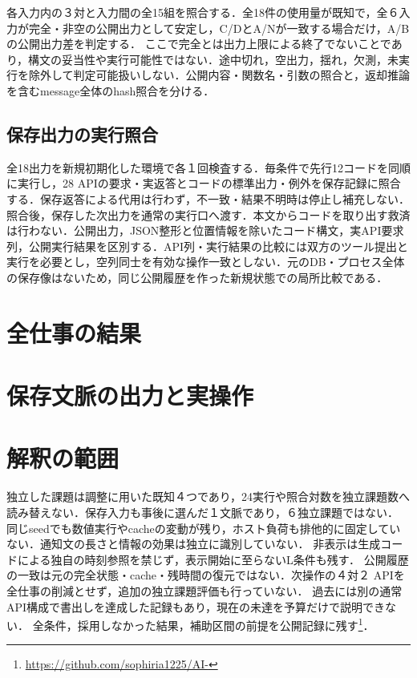 \documentclass[letter]{ieicej}
\begin{document}
各入力内の３対と入力間の全15組を照合する．全18件の使用量が既知で，全６入力が完全・非空の公開出力として安定し，C/DとA/Nが一致する場合だけ，A/Bの公開出力差を判定する．
ここで完全とは出力上限による終了でないことであり，構文の妥当性や実行可能性ではない．途中切れ，空出力，揺れ，欠測，未実行を除外して判定可能扱いしない．公開内容・関数名・引数の照合と，返却推論を含むmessage全体のhash照合を分ける．

\subsection{保存出力の実行照合}
全18出力を新規初期化した環境で各１回検査する．毎条件で先行12コードを同順に実行し，28 APIの要求・実返答とコードの標準出力・例外を保存記録に照合する．保存返答による代用は行わず，不一致・結果不明時は停止し補充しない．照合後，保存した次出力を通常の実行口へ渡す．本文からコードを取り出す救済は行わない．公開出力，JSON整形と位置情報を除いたコード構文，実API要求列，公開実行結果を区別する．API列・実行結果の比較には双方のツール提出と実行を必要とし，空列同士を有効な操作一致としない．元のDB・プロセス全体の保存像はないため，同じ公開履歴を作った新規状態での局所比較である．

\section{全仕事の結果}





\section{保存文脈の出力と実操作}


\section{解釈の範囲}
独立した課題は調整に用いた既知４つであり，24実行や照合対数を独立課題数へ読み替えない．保存入力も事後に選んだ１文脈であり，６独立課題ではない．
同じseedでも数値実行やcacheの変動が残り，ホスト負荷も排他的に固定していない．通知文の長さと情報の効果は独立に識別していない．
非表示は生成コードによる独自の時刻参照を禁じず，表示開始に至らないL条件も残す．
公開履歴の一致は元の完全状態・cache・残時間の復元ではない．次操作の４対２ APIを全仕事の削減とせず，追加の独立課題評価も行っていない．
過去には別の通常API構成で書出しを達成した記録もあり，現在の未達を予算だけで説明できない．
全条件，採用しなかった結果，補助区間の前提を公開記録に残す\footnote{\url{https://github.com/sophiria1225/AI-}}．
\end{document}
